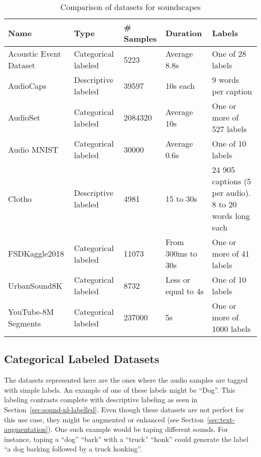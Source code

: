\begin{table}[ht]
\centering
\caption{Comparison of datasets for soundscapes}
\label{tab:datasets}
\begin{tabularx}{\textwidth}{|X|X|X|X|X|}
\hline
\textbf{Name} &
  \textbf{Type} &
  \textbf{\# Samples} &
  \textbf{Duration} &
  \textbf{Labels} \\ \hline

Acoustic Event Dataset \cite{takahashi_deep_2016} &
  Categorical labeled &
  5223 &
  Average 8.8s &
  One of 28 labels \\ \hline

AudioCaps \cite{kim_audiocaps_2019} &
  Descriptive labeled &
  39597 &
  10s each &
  9 words per caption \\ \hline

AudioSet \cite{gemmeke_audio_2017} &
  Categorical labeled &
  2084320 &
  Average 10s &
  One or more of 527 labels \\ \hline

Audio MNIST~\cite{becker_interpreting_2018}&
  Categorical labeled &
  30000 &
  Average 0.6s &
  One of 10 labels \\ \hline
  
Clotho \cite{drossos_clotho_2019} &
    Descriptive labeled &
    4981 &
    15 to 30s &
    24 905 captions (5 per audio). 8 to 20 words long each \\ \hline
    
FSDKaggle2018 \cite{fonseca_general-purpose_2018} &
  Categorical labeled &
  11073 &
  From 300ms to 30s &
  One or more of 41 labels \\ \hline
  
UrbanSound8K \cite{salamon_dataset_2014} &
  Categorical labeled &
  8732 &
  Less or equal to 4s &
  One of 10 labels \\ \hline
  
YouTube-8M Segments \cite{abu-el-haija_youtube-8m_2016} &
  Categorical labeled &
  237000 &
  5s &
  One or more of 1000 labels \\ \hline
\end{tabularx}
\end{table}

\subsection{Categorical Labeled Datasets}

The datasets represented here are the ones where the audio samples are tagged with simple labels. An example of one of these labels might be ``Dog''. This labeling contrasts complete with descriptive labeling as seen in Section~\ref{sec:sound-nl-labelled}. Even though these datasets are not perfect for this use case, they might be augmented or enhanced (see Section~\ref{sec:text-augmentation}). One such example would be taping different sounds. For instance, taping a ``dog''  ``bark'' with a ``truck'' ``honk'' could generate the label ``a dog barking followed by a truck honking''.

